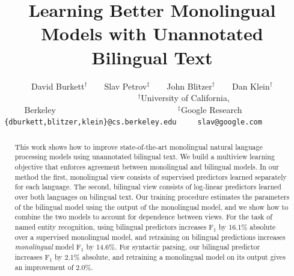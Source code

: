 \documentclass[11pt]{article}
\title{
Learning Better Monolingual Models with Unannotated Bilingual Text
}
\author{David Burkett$^\dag$~~~~Slav Petrov$^\ddag$~~~~John Blitzer$^\dag$~~~~Dan Klein$^\dag$\\[0.3cm]
~~~~~~~~~~~~~~~$^\dagger$University of California, Berkeley~~~~~~~~~~~~~~~~~~~~~~~~~~~~~$^\ddag$Google Research~~~~~~~~~ \\
{\tt \{dburkett,blitzer,klein\}@cs.berkeley.edu}~~~~~{\tt slav@google.com}~~~~~~~~~
}
\date{}
\begin{document}
\maketitle
\begin{abstract}
\small 

This work shows how to improve state-of-the-art monolingual natural
language processing models using unannotated bilingual text.  We build
a multiview learning objective that enforces agreement between
monolingual and bilingual models.  In our method the first,
monolingual view consists of supervised predictors learned separately
for each language.  The second, bilingual view consists of log-linear
predictors learned over both languages on bilingual text.  Our
training procedure estimates the parameters of the bilingual model
using the output of the monolingual model, and we show how to combine
the two models to account for dependence between views.  For the task
of named entity recognition, using bilingual predictors increases
F$_1$ by 16.1\% absolute over a supervised monolingual model, and
retraining on bilingual predictions increases \emph{monolingual} model
F$_1$ by 14.6\%.  For syntactic parsing, our bilingual predictor
increases F$_1$ by 2.1\% absolute, and retraining a monolingual model
on its output gives an improvement of 2.0\%.\\[0.1cm]

\end{abstract}

























\balance


\end{document}
